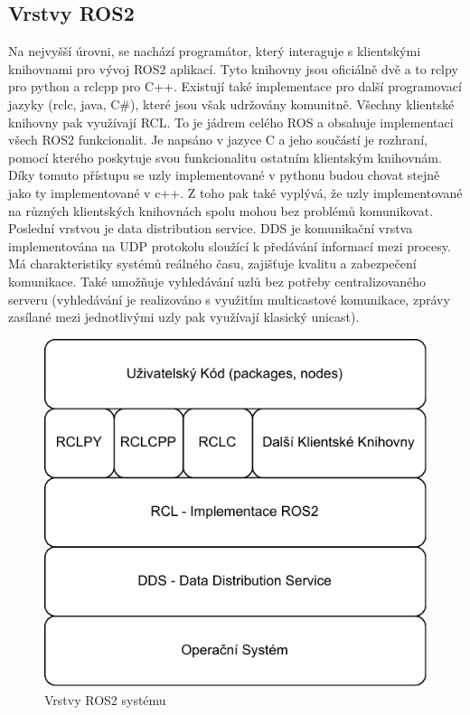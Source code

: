 \subsection*{Vrstvy ROS2}
Na nejvyšší úrovni, se nachází programátor, který interaguje s klientskými knihovnami pro vývoj ROS2 aplikací. Tyto knihovny jsou oficiálně dvě a to rclpy pro python a rclcpp pro C++. Existují také implementace pro další programovací jazyky (rclc, java, C\#), které jsou však udržovány komunitně. Všechny klientské knihovny pak využívají RCL. To je jádrem celého ROS a obsahuje implementaci všech ROS2 funkcionalit. Je napsáno v jazyce C a jeho součástí je rozhraní, pomocí kterého poskytuje svou funkcionalitu ostatním klientským knihovnám. Díky tomuto přístupu se uzly implementované v pythonu budou chovat stejně jako ty implementované v c++. Z toho pak také vyplývá, že uzly implementované na různých klientských knihovnách spolu mohou bez problémů komunikovat.
Poslední vrstvou je data distribution service. DDS je komunikační vrstva implementována na UDP protokolu sloužící k předávání informací mezi procesy. Má charakteristiky systémů reálného času, zajišťuje kvalitu a zabezpečení komunikace. Také umožňuje vyhledávání uzlů bez potřeby centralizovaného serveru (vyhledávání je realizováno s využitím multicastové komunikace, zprávy zasílané mezi jednotlivými uzly pak využívají klasický unicast). \cite{ros2_introduction}

\begin{figure}[h!]
	\centering
	\includegraphics[scale=0.75]{obrazky-figures/ros_layers.pdf}
	\caption{Vrstvy ROS2 systému}
	\label{}
\end{figure}

